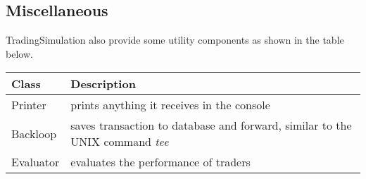 \subsection{Miscellaneous}

TradingSimulation also provide some utility components as shown in the table below.\\

\noindent
\begin{tabularx}{\textwidth}{|l|X|}
  \hline
  Class & Description  \\
  \hline
  Printer & prints anything it receives in the console \\
  \hline
  Backloop  & saves transaction to database and forward, similar to the UNIX command \emph{tee}  \\
  \hline
  Evaluator & evaluates the performance of traders\\
  \hline
\end{tabularx}\\[0.3cm]
